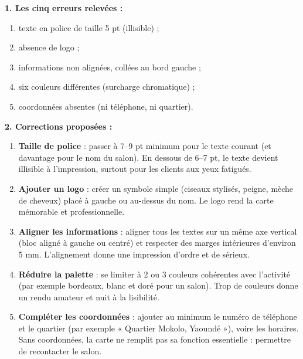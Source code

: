 \documentclass[11pt]{article}
\begin{document}
\begin{corrige}
\textbf{1. Les cinq erreurs relevées :}
\begin{enumerate}
\item texte en police de taille 5 pt (illisible) ;
\item absence de logo ;
\item informations non alignées, collées au bord gauche ;
\item six couleurs différentes (surcharge chromatique) ;
\item coordonnées absentes (ni téléphone, ni quartier).
\end{enumerate}
\textbf{2. Corrections proposées :}
\begin{enumerate}
\item \textbf{Taille de police} : passer à 7--9 pt minimum pour le texte courant (et davantage pour le nom du salon). En dessous de 6--7 pt, le texte devient illisible à l'impression, surtout pour les clients aux yeux fatigués.
\item \textbf{Ajouter un logo} : créer un symbole simple (ciseaux stylisés, peigne, mèche de cheveux) placé à gauche ou au-dessus du nom. Le logo rend la carte mémorable et professionnelle.
\item \textbf{Aligner les informations} : aligner tous les textes sur un même axe vertical (bloc aligné à gauche ou centré) et respecter des marges intérieures d'environ 5 mm. L'alignement donne une impression d'ordre et de sérieux.
\item \textbf{Réduire la palette} : se limiter à 2 ou 3 couleurs cohérentes avec l'activité (par exemple bordeaux, blanc et doré pour un salon). Trop de couleurs donne un rendu amateur et nuit à la lisibilité.
\item \textbf{Compléter les coordonnées} : ajouter au minimum le numéro de téléphone et le quartier (par exemple « Quartier Mokolo, Yaoundé »), voire les horaires. Sans coordonnées, la carte ne remplit pas sa fonction essentielle : permettre de recontacter le salon.
\end{enumerate}
\end{corrige}
\end{document}
